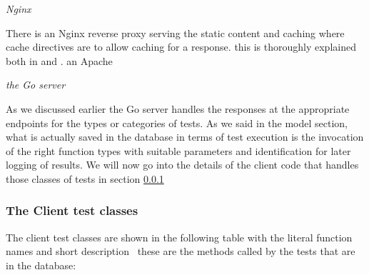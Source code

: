 \emph{Nginx}

There is an Nginx reverse proxy serving the static content and caching where cache directives are to allow caching for a response. this is thoroughly explained both in 
\cite{charlie} and \cite{maffeis}. an Apache 

\emph{the Go server}

As we discussed earlier the Go server handles the responses at the appropriate endpoints for the types or categories of tests. As we said in the model section, what is 
actually saved in the database in terms of test execution is the invocation of the right function types with suitable parameters and identification for later logging of results.
We will now go into the details of the client code that handles those classes of tests in section \ref{label:client}

\subsubsection{The Client test classes }
\label{label:client}

The client test classes are shown in the following table with the literal function names and short description \
these are the methods called by the tests that are in the database:

